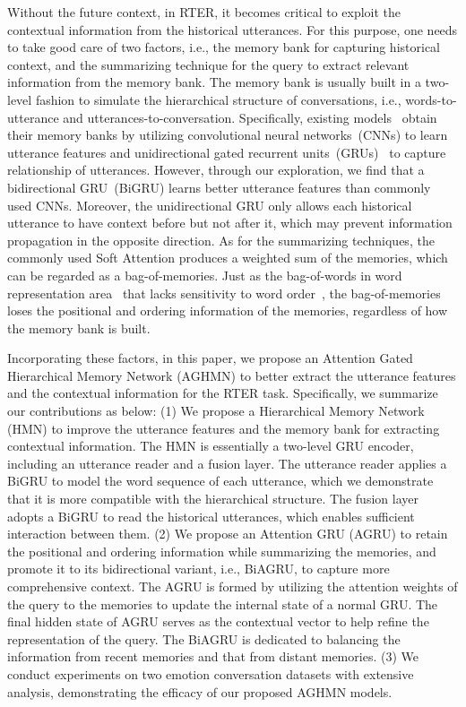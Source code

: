 \documentclass[letterpaper]{article} \usepackage{aaai20}  \usepackage{times}  \usepackage{helvet} \usepackage{courier}  \usepackage[hyphens]{url}  \usepackage{graphicx} \urlstyle{rm} \def\UrlFont{\rm}  \usepackage{graphicx}  \frenchspacing  \setlength{\pdfpagewidth}{8.5in}  \setlength{\pdfpageheight}{11in}
\begin{document}
Without the future context, in RTER, it becomes critical to exploit the contextual information from the historical utterances. For this purpose, one needs to take good care of two factors, i.e., the memory bank for capturing historical context, and the summarizing technique for the query to extract relevant information from the memory bank.
The memory bank is usually built in a two-level fashion to simulate the hierarchical structure of conversations, i.e., words-to-utterance and utterances-to-conversation. Specifically, existing models~\cite{DBLP:conf/emnlp/HazarikaPMCZ18,DBLP:conf/naacl/HazarikaPZCMZ18,DBLP:conf/aaai/MajumderPHMGC19} obtain their memory banks by utilizing convolutional neural networks~(CNNs) to learn utterance features and unidirectional gated recurrent units~(GRUs)~\cite{DBLP:conf/emnlp/ChoMGBBSB14} to capture relationship of utterances. However, through our exploration, we find that a bidirectional GRU~(BiGRU) learns better utterance features than commonly used CNNs. Moreover, the unidirectional GRU only allows each historical utterance to have context before but not after it, which may prevent information propagation in the opposite direction. As for the summarizing techniques, the commonly used Soft Attention produces a weighted sum of the memories, which can be regarded as a bag-of-memories. Just as the bag-of-words in word representation area~\cite{DBLP:conf/nips/MikolovSCCD13} that lacks sensitivity to word order~\cite{DBLP:conf/emnlp/LingTAFDBTL15}, the bag-of-memories loses the positional and ordering information of the memories, regardless of how the memory bank is built.

Incorporating these factors, in this paper, we propose an Attention Gated Hierarchical Memory Network (AGHMN) to better extract the utterance features and the contextual information for the RTER task. Specifically, we summarize our contributions as below: (1) We propose a Hierarchical Memory Network (HMN) to improve the utterance features and the memory bank for extracting contextual information. The HMN is essentially a two-level GRU encoder, including an utterance reader and a fusion layer. 
The utterance reader applies a BiGRU to model the word sequence of each utterance, which we demonstrate that it is more compatible with the hierarchical structure. The fusion layer adopts a BiGRU to read the historical utterances, which enables sufficient interaction between them. 
(2) We propose an Attention GRU (AGRU) to retain the positional and ordering information while summarizing the memories, and promote it to its bidirectional variant, i.e., BiAGRU, to capture more comprehensive context. The AGRU is formed by utilizing the attention weights of the query to the memories to update the internal state of a normal GRU. The final hidden state of AGRU serves as the contextual vector to help refine the representation of the query. The BiAGRU is dedicated to balancing the information from recent memories and that from distant memories.
(3) We conduct experiments on two emotion conversation datasets with extensive analysis, demonstrating the efficacy of our proposed AGHMN models.
\end{document}
